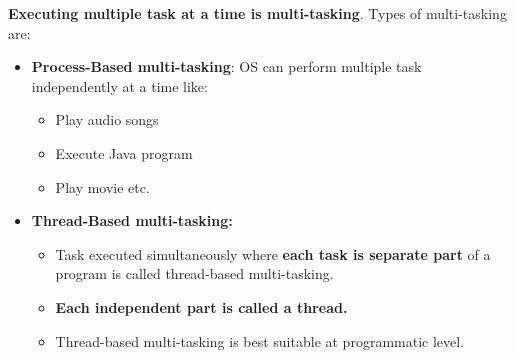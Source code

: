\setlength{\columnsep}{3pt}
\begin{flushleft}
	
		\textbf{Executing multiple task at a time is multi-tasking}. Types of multi-tasking are:
		\begin{itemize}
			\item \textbf{Process-Based multi-tasking}: OS can perform multiple task independently at a time like:
			\begin{itemize}
				\item Play audio songs
				\item Execute Java program
				\item Play movie etc.
			\end{itemize}
			
			\item \textbf{Thread-Based multi-tasking:}
			\begin{itemize}
				\item Task executed simultaneously where \textbf{each task is separate part} of a program is called thread-based multi-tasking.
				\item \textbf{Each independent part is called a thread.}
				\item Thread-based multi-tasking is best suitable at programmatic level.
			\end{itemize}
		\end{itemize}

	
\end{flushleft}



